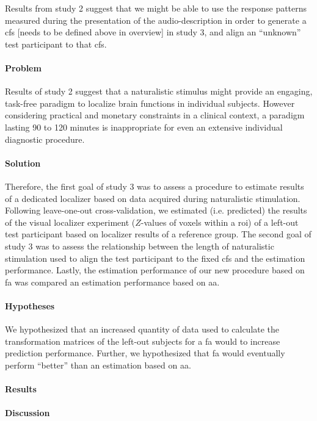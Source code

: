 


Results from study 2 suggest that we might be able to use the response patterns
measured during the presentation of the audio-description in order to generate a
\ac{cfs} [needs to be defined above in overview] in study 3, and
align an ``unknown'' test participant to that \ac{cfs}.


\paragraph{Problem}
Results of study 2 suggest that a naturalistic stimulus might provide an
engaging, task-free paradigm to localize brain functions in individual subjects.
%
However considering practical and monetary constraints in a clinical context, a
paradigm lasting 90 to 120 minutes is inappropriate for even an extensive
individual diagnostic procedure.


\paragraph{Solution}
%
Therefore, the first goal of study 3 was to assess a procedure to estimate
results of a dedicated localizer \citep{sengupta2016extension} based on data
acquired during naturalistic stimulation.
%
Following leave-one-out cross-validation, we estimated (i.e. predicted) the
results of the visual localizer experiment ($Z$-values of voxels within a
\ac{roi}) of a left-out test participant based on localizer results of a
reference group.
The second goal of study 3 was to assess the relationship between the length of
naturalistic stimulation used to align the test participant to the fixed
\ac{cfs} and the estimation performance.
%
Lastly, the estimation performance of our new procedure based on \ac{fa} was
compared an estimation performance based on \ac{aa}.


\paragraph{Hypotheses}
%
We hypothesized that an increased quantity of data used to calculate the
transformation matrices of the left-out subjects for a \ac{fa} would to increase
prediction performance.
%
Further, we hypothesized that \ac{fa} would eventually perform ``better'' than
an estimation based on \ac{aa}.


\paragraph{Results}


\paragraph{Discussion}
